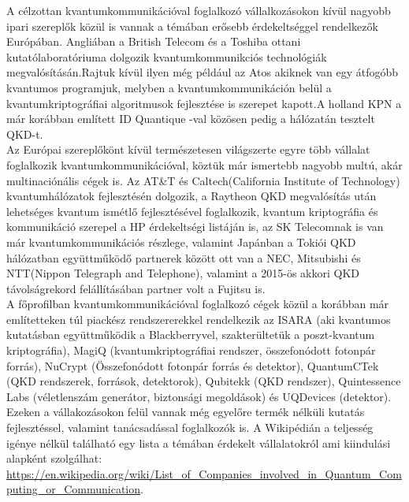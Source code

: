 A célzottan kvantumkommunikációval foglalkozó vállalkozásokon kívül nagyobb ipari szereplők közül is vannak a témában erősebb érdekeltséggel rendelkezők Európában. Angliában a British Telecom és a Toshiba ottani kutatólaboratóriuma dolgozik kvantumkommunikciós technológiák megvalósításán.Rajtuk kívül ilyen még például az Atos akiknek van egy átfogóbb kvantumos programjuk, melyben a kvantumkommunikáción belül a kvantumkriptográfiai algoritmusok fejlesztése is szerepet kapott.A holland KPN a már korábban említett ID Quantique -val közösen pedig a hálózatán tesztelt QKD-t.\\
Az Európai szereplőkönt kívül természetesen világszerte egyre több vállalat foglalkozik kvantumkommunikációval, köztük már ismertebb nagyobb multú, akár multinaciónális cégek is. Az AT\&T és Caltech(California Institute of Technology) kvantumhálózatok fejlesztésén dolgozik, a Raytheon QKD megvalósítás után lehetséges kvantum ismétlő fejlesztésével foglalkozik, kvantum kriptográfia és kommunikáció szerepel a HP érdekeltségi listáján is, az SK Telecomnak is van már kvantumkommunikációs részlege, valamint Japánban a Tokiói QKD hálózatban együttműködő partnerek között ott van a NEC, Mitsubishi és NTT(Nippon Telegraph and Telephone), valamint a 2015-ös akkori QKD távolságrekord felállításában partner volt a Fujitsu is.\\
A főprofilban kvantumkommunikációval foglalkozó cégek közül a korábban már említetteken túl  piackész rendszererekkel rendelkezik az ISARA (aki kvantumos kutatásban együttműködik a Blackberryvel, szakterültetük a poszt-kvantum kriptográfia), MagiQ (kvantumkriptográfiai rendszer, összefonódott fotonpár forrás), NuCrypt (Összefonódott fotonpár forrás és detektor), QuantumCTek (QKD rendszerek, források, detektorok), Qubitekk (QKD rendszer), Quintessence Labs (véletlenszám generátor, biztonsági megoldások) és UQDevices (detektor). Ezeken a vállakozásokon felül vannak még egyelőre termék nélküli kutatás fejlesztéssel, valamint tanácsadással foglalkozók is. A Wikipédián a teljesség igénye nélkül található egy lista a témában érdekelt vállalatokról ami kiindulási alapként szolgálhat: \url{https://en.wikipedia.org/wiki/List_of_Companies_involved_in_Quantum_Computing_or_Communication}.




